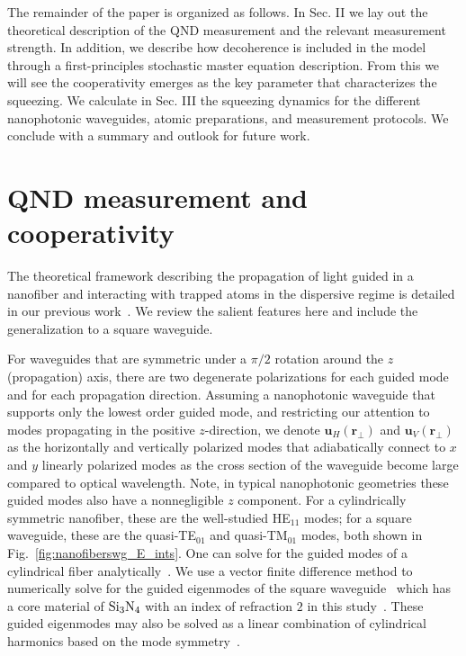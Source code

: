 \documentclass[aps,pra,twocolumn,superscriptaddress]{revtex4-1} %
\newcommand{\mbf}[1]{\mathbf{#1}}
\begin{document}
The remainder of the paper is organized as follows.  In Sec. II we lay out the theoretical description of the QND measurement and the relevant measurement strength.  In addition, we describe how decoherence is included in the model through a first-principles stochastic master equation description.  From this we will see the cooperativity emerges as the key parameter that characterizes the squeezing.  We calculate in Sec. III the squeezing dynamics for the different nanophotonic waveguides, atomic preparations, and measurement protocols.  We conclude with a summary and outlook for future work.


\section{QND measurement and cooperativity} \label{Sec::QNDandCooperativityTheory}
The theoretical framework describing the propagation of light guided in a nanofiber and interacting with trapped atoms in the dispersive regime is detailed in our previous work~\cite{Qi2016}.  We review the salient features here and include the generalization to a square waveguide.

For waveguides that are symmetric under a $\pi/2$ rotation around the $z$ (propagation) axis, there are two degenerate polarizations for each guided mode and for each propagation direction.  Assuming a nanophotonic waveguide that supports only the lowest order guided mode, and restricting our attention to modes propagating in the positive $z$-direction, we denote $\mbf{u}_H(\mbf{r}_\perp)$ and  $\mbf{u}_V(\mbf{r}_\perp)$ as the horizontally and vertically polarized modes that adiabatically connect to $x$ and $y$ linearly polarized modes as the cross section of the waveguide become large compared to optical wavelength.  Note, in typical nanophotonic geometries these guided modes also have a nonnegligible $z$ component.  For a cylindrically symmetric nanofiber, these are the well-studied HE$_{11}$ modes; for a square waveguide, these are the quasi-TE$_{01}$ and quasi-TM$_{01}$ modes, both shown in Fig.~\eqref{fig:nanofiberswg_E_ints}. One can solve for the guided modes of a cylindrical fiber analytically~\cite{Kien2004,Vetsch2010Opticala,Qi2016}. We use a vector finite difference method to numerically solve for the guided eigenmodes of the square waveguide~\cite{Fallahkhair2008} which has a core material of $ \rm{Si}_3\rm{N}_4 $ with an index of refraction $ 2 $ in this study~\cite{Lee2013}. These guided eigenmodes may also be solved as a linear combination of cylindrical harmonics based on the mode symmetry~\cite{Pavlovic2010Dispersion}.
\end{document}
